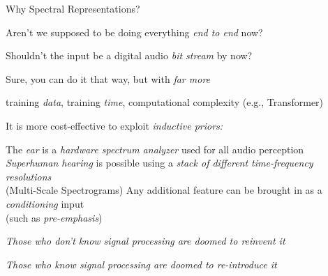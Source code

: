 \begin{slide}[\slideopts,toc={Spectra}]{Why Spectral Representations?}

  Aren't we supposed to be doing everything \emph{end to end} now?

  Shouldn't the input be a digital audio \emph{bit stream} by now?

  \begin{itemize}

    \mpitem Sure, you can do it that way, but with \emph{far more}
    \begin{itemize}
      \mpitem training \emph{data},
      \mpitem training \emph{time}, 
      \mpitem computational complexity (e.g., Transformer)
    \end{itemize}
    \mpitem It is more cost-effective to exploit \emph{inductive priors:}
    \begin{itemize}
      \mpitem The \emph{ear} is a \emph{hardware spectrum analyzer} used for all audio perception
      \mpitem \emph{Superhuman hearing} is possible using a \emph{stack of different time-frequency resolutions}\\
      (Multi-Scale Spectrograms)
      \mpitem Any additional feature can be brought in as a \emph{conditioning} input\\
      (such as \emph{pre-emphasis})
    \end{itemize}

  \end{itemize}

  \vspace{-1em}
\maybepause
    \centerline{\textit{Those who don't know signal processing are doomed to reinvent it}}
\maybepause
    \centerline{\textit{Those who know signal processing are doomed to re-introduce it}}

\end{slide}



